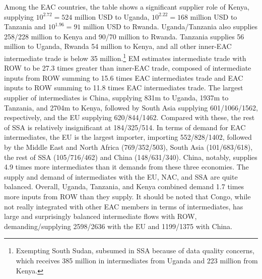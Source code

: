 \documentclass[a4paper]{article}
\begin{document}
Among the EAC countries, the table shows a significant supplier role of Kenya, supplying $10^{2.72} = 524$ million USD to Uganda, $10^{2.22} = 168$ million USD to Tanzania and  $10^{1.96} = 91$ million USD to Rwanda. Uganda/Tanzania also supplies 258/228 million to Kenya and 90/70 million to Rwanda. Tanzania supplies 56 million to Uganda, Rwanda 54 million to Kenya, and all other inner-EAC intermediate trade is below 35 million.\footnote{Exempting South Sudan, subsumed in SSA because of data quality concerns, which receives 385 million in intermediates from Uganda and 223 million from Kenya.} EM estimates intermediate trade with ROW to be 27.3 times greater than inner-EAC trade, composed of intermediate inputs from ROW summing to 15.6 times EAC intermediates trade and EAC inputs to ROW summing to 11.8 times EAC intermediates trade. The largest supplier of intermediates is China, supplying 831m to Uganda, 1937m to Tanzania, and 2704m to Kenya, followed by South Asia supplying 601/1066/1562, respectively, and the EU supplying 620/844/1462. Compared with these, the rest of SSA is relatively insignificant at 184/325/514. In terms of demand for EAC intermediates, the EU is the largest importer, importing 552/828/1402, followed by the Middle East and North Africa (769/352/503), South Asia (101/683/618), the rest of SSA (105/716/462) and China (148/631/340). China, notably, supplies 4.9 times more intermediates than it demands from these three economies. The supply and demand of intermediates with the EU, NAC, and SSA are quite balanced. Overall, Uganda, Tanzania, and Kenya combined demand 1.7 times more inputs from ROW than they supply. It should be noted that Congo, while not really integrated with other EAC members in terms of intermediates, has large and surprisingly balanced intermediate flows with ROW, demanding/supplying 2598/2636 with the EU and 1199/1375 with China. 
\end{document}
